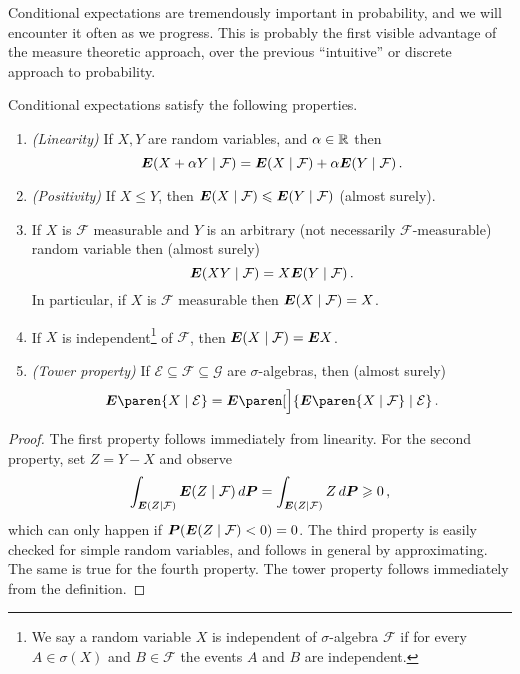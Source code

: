 Conditional expectations are tremendously important in probability, and we will encounter it often as we progress.
This is probably the first visible advantage of the measure theoretic approach, over the previous ``intuitive'' or discrete approach to probability.

\begin{proposition}
  Conditional expectations satisfy the following properties.
  \begin{enumerate}
    \item
      \emph{(Linearity)}
      If $X, Y$ are random variables, and $\alpha \in \mathbb{R}$ then
      \begin{equation*}
	\E( X + \alpha Y \given \mathcal F ) = \E( X \given \mathcal F ) + \alpha \E( Y \given \mathcal F )\,.
      \end{equation*}

    \item
      \emph{(Positivity)}
      If $X \leq Y$, then $\E(X \given \mathcal F) \leq \E(Y \given \mathcal F)$ (almost surely).

    \item If $X$ is $\mathcal F$ measurable and $Y$ is an arbitrary (not necessarily $\mathcal F$-measurable) random variable then (almost surely)
      \begin{equation*}
	\E( XY \given \mathcal F) = X \E( Y \given \mathcal F ) \,.
      \end{equation*}
      In particular, if $X$ is $\mathcal F$ measurable then $\E( X \given \mathcal F) = X$.
    \item
      If $X$ is independent\footnote{%
	We say a random variable $X$ is independent of $\sigma$-algebra $\mathcal F$ if for every $A \in \sigma(X)$ and $B \in \mathcal F$ the events $A$ and $B$ are independent.%
      }
      of $\mathcal F$, then $\E( X \given \mathcal F) = \E X$.
    \item
      \emph{(Tower property)}
      If $\mathcal E \subseteq \mathcal F \subseteq \mathcal G$ are $\sigma$-algebras, then (almost surely)
      \begin{equation*}
	\E\paren{ X \given \mathcal E } =
	  \E\paren[\Big]{ \E\paren{ X \given \mathcal F } \given \mathcal E }\,.
      \end{equation*}
  \end{enumerate}
\end{proposition}
\begin{proof}
  The first property follows immediately from linearity.
  For the second property, set $Z = Y - X$ and observe
  \begin{equation*}
    \int_{\E(Z \given \mathcal F)} \E(Z \given \mathcal F) \, d\P
    = \int_{\E(Z \given \mathcal F)} Z \, d\P
    \geq 0\,,
  \end{equation*}
  which can only happen if $\P( \E( Z \given \mathcal F ) < 0 ) = 0$.
  The third property is easily checked for simple random variables, and follows in general by approximating.
  The same is true for the fourth property.
  The tower property follows immediately from the definition.
\end{proof}

